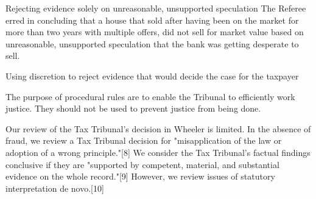 Rejecting evidence solely on unreasonable, unsupported speculation 
The Referee erred in concluding that a house that sold after having been on the market for more than two years with multiple offers, did not sell for market value based on unreasonable, unsupported speculation that the bank was getting desperate to sell. 
 
Using discretion to reject evidence that would decide the case for the taxpayer 


The purpose of procedural rules are to enable the Tribunal to efficiently work justice. They should not be used to prevent justice from being done.





Our review of the Tax Tribunal's decision in Wheeler is limited. In the absence of fraud, we review a Tax Tribunal decision for "misapplication of the law or adoption of a wrong principle."[8] We consider the Tax Tribunal's factual findings conclusive if they are "supported by competent, material, and substantial evidence on the whole record."[9] However, we review issues of statutory interpretation de novo.[10]

